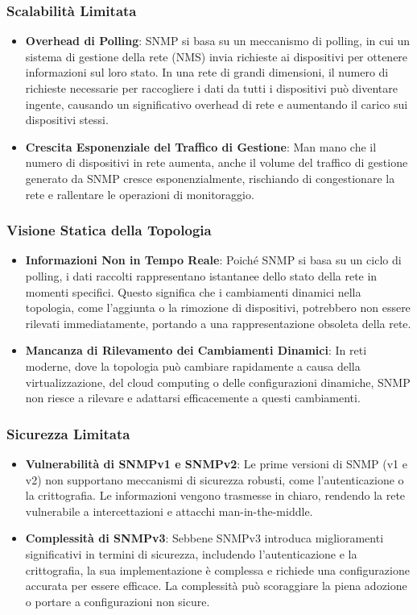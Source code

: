 \documentclass[target=bach,aauheader=,style=]{thud}
\begin{document}
\subsubsection{Scalabilità Limitata}
    \begin{itemize}
      \item \textbf{Overhead di Polling}: SNMP si basa su un meccanismo di polling, in cui un sistema di gestione della rete (NMS) invia richieste ai dispositivi per ottenere informazioni sul loro stato. In una rete di grandi dimensioni, il numero di richieste necessarie per raccogliere i dati da tutti i dispositivi può diventare ingente, causando un significativo overhead di rete e aumentando il carico sui dispositivi stessi.
      \item \textbf{Crescita Esponenziale del Traffico di Gestione}: Man mano che il numero di dispositivi in rete aumenta, anche il volume del traffico di gestione generato da SNMP cresce esponenzialmente, rischiando di congestionare la rete e rallentare le operazioni di monitoraggio.
    \end{itemize}

\subsubsection{ Visione Statica della Topologia}
  \begin{itemize}
    \item \textbf{Informazioni Non in Tempo Reale}: Poiché SNMP si basa su un ciclo di polling, i dati raccolti rappresentano istantanee dello stato della rete in momenti specifici. Questo significa che i cambiamenti dinamici nella topologia, come l'aggiunta o la rimozione di dispositivi, potrebbero non essere rilevati immediatamente, portando a una rappresentazione obsoleta della rete.
    \item \textbf{Mancanza di Rilevamento dei Cambiamenti Dinamici}: In reti moderne, dove la topologia può cambiare rapidamente a causa della virtualizzazione, del cloud computing o delle configurazioni dinamiche, SNMP non riesce a rilevare e adattarsi efficacemente a questi cambiamenti.
  \end{itemize}


\subsubsection{Sicurezza Limitata}
    \begin{itemize}
      \item \textbf{Vulnerabilità di SNMPv1 e SNMPv2}: Le prime versioni di SNMP (v1 e v2) non supportano meccanismi di sicurezza robusti, come l'autenticazione o la crittografia. Le informazioni vengono trasmesse in chiaro, rendendo la rete vulnerabile a intercettazioni e attacchi man-in-the-middle.
      \item \textbf{Complessità di SNMPv3}: Sebbene SNMPv3 introduca miglioramenti significativi in termini di sicurezza, includendo l'autenticazione e la crittografia, la sua implementazione è complessa e richiede una configurazione accurata per essere efficace. La complessità può scoraggiare la piena adozione o portare a configurazioni non sicure.
    \end{itemize}
\end{document}
